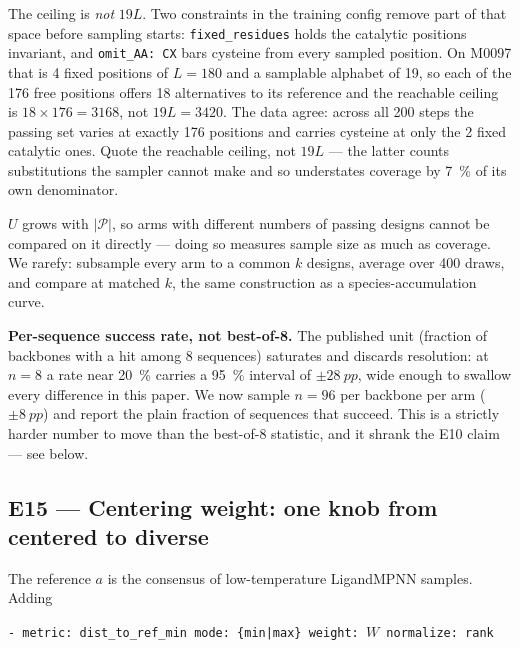 The ceiling is \emph{not} $19L$. Two constraints in the training config remove
part of that space before sampling starts: \texttt{fixed\_residues} holds the
catalytic positions invariant, and \texttt{omit\_AA: CX} bars cysteine from
every sampled position. On M0097 that is 4 fixed positions of $L = 180$ and a
samplable alphabet of 19, so each of the 176 free positions offers 18
alternatives to its reference and the reachable ceiling is
$18 \times 176 = 3168$, not $19L = 3420$. The data agree: across all 200 steps
the passing set varies at exactly 176 positions and carries cysteine at only
the 2 fixed catalytic ones. Quote the reachable ceiling, not $19L$ --- the
latter counts substitutions the sampler cannot make and so understates coverage
by \SI{7}{\percent} of its own denominator.

$U$ grows with $|\mathcal{P}|$, so arms with different numbers of passing
designs cannot be compared on it directly --- doing so measures sample size as
much as coverage. We rarefy: subsample every arm to a common $k$ designs,
average over 400 draws, and compare at matched $k$, the same construction as a
species-accumulation curve.

\textbf{Per-sequence success rate, not best-of-8.} The published unit (fraction
of backbones with a hit among 8 sequences) saturates and discards resolution:
at $n{=}8$ a rate near \SI{20}{\percent} carries a \SI{95}{\percent} interval of
${\pm}\SI{28}{pp}$, wide enough to swallow every difference in this paper. We
now sample $n{=}96$ per backbone per arm (${\pm}\SI{8}{pp}$) and report the
plain fraction of sequences that succeed. This is a strictly harder number to
move than the best-of-8 statistic, and it shrank the E10 claim --- see below.

\subsection*{E15 --- Centering weight: one knob from centered to diverse}


The reference $a$ is the consensus of low-temperature LigandMPNN samples. Adding

\begin{center}
\texttt{- metric: dist\_to\_ref\_min \quad mode: \{min|max\} \quad weight: $W$ \quad normalize: rank}
\end{center}

